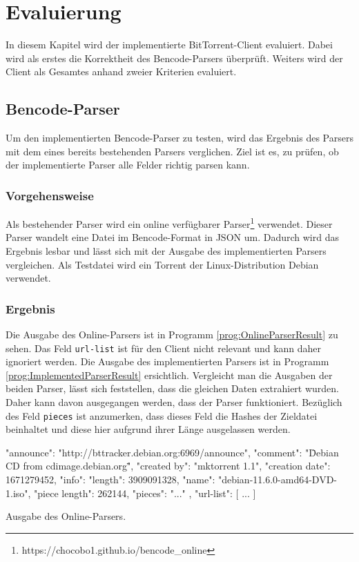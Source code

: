 \chapter{Evaluierung}
\label{cha:Evaluierung}
In diesem Kapitel wird der implementierte BitTorrent-Client evaluiert. Dabei wird als erstes die Korrektheit des Bencode-Parsers überprüft. Weiters wird der Client als Gesamtes anhand zweier Kriterien evaluiert.

\section{Bencode-Parser}

Um den implementierten Bencode-Parser zu testen, wird das Ergebnis des Parsers mit dem eines bereits bestehenden Parsers verglichen. Ziel ist es, zu prüfen, ob der implementierte Parser alle Felder richtig parsen kann. 

\subsection{Vorgehensweise}

Als bestehender Parser wird ein online verfügbarer Parser\footnote[1]{https://chocobo1.github.io/bencode\_online} verwendet. Dieser Parser wandelt eine Datei im Bencode-Format in JSON um. Dadurch wird das Ergebnis lesbar und lässt sich mit der Ausgabe des implementierten Parsers vergleichen. Als Testdatei wird ein Torrent der Linux-Distribution Debian verwendet.

\subsection{Ergebnis}
Die Ausgabe des Online-Parsers ist in Programm \ref{prog:OnlineParserResult} zu sehen. Das Feld \verb|url-list| ist für den Client nicht relevant und kann daher ignoriert werden. Die Ausgabe des implementierten Parsers ist in Programm \ref{prog:ImplementedParserResult} ersichtlich. Vergleicht man die Ausgaben der beiden Parser, lässt sich feststellen, dass die gleichen Daten extrahiert wurden. Daher kann davon ausgegangen werden, dass der Parser funktioniert. Bezüglich des Feld \verb|pieces| ist anzumerken, dass dieses Feld die Hashes der Zieldatei beinhaltet und diese hier aufgrund ihrer Länge ausgelassen werden.

\begin{program}
    \begin{GenericCode}[numbers=none]
{
    "announce": "http://bttracker.debian.org:6969/announce",
    "comment": "\"Debian CD from cdimage.debian.org\"",
    "created by": "mktorrent 1.1",
    "creation date": 1671279452,
    "info": {
       "length": 3909091328,
       "name": "debian-11.6.0-amd64-DVD-1.iso",
       "piece length": 262144,
       "pieces": "..."
       },
    "url-list": [
       ...
    ]
}
\end{GenericCode}
\caption{Ausgabe des Online-Parsers.}
\label{prog:OnlineParserResult}
\end{program}

